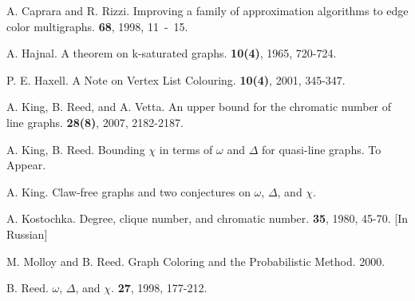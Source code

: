 \documentclass[12pt]{article}
\theoremstyle{plain}
\theoremstyle{definition}
\theoremstyle{remark}
\begin{document}
\begin{thebibliography}{1}

A. Caprara and R. Rizzi.
\newblock Improving a family of approximation algorithms to edge color multigraphs.
 \textbf{68}, 1998, \mbox{11 - 15.}

A. Hajnal.
\newblock A theorem on k-saturated graphs. 
 \textbf{10(4)}, 1965, \mbox{720-724}.

P. E. Haxell.
\newblock A Note on Vertex List Colouring. 
 \textbf{10(4)}, 2001, \mbox{345-347}.

A. King, B. Reed, and A. Vetta. 
\newblock An upper bound for the chromatic number of line graphs. 
 \textbf{28(8)}, 2007, \mbox{2182-2187}.

A. King, B. Reed.
\newblock Bounding $\chi$ in terms of $\omega$ and $\Delta$ for quasi-line graphs.
 To Appear.

A. King.
\newblock Claw-free graphs and two conjectures on $\omega$, $\Delta$, and $\chi$.

A. Kostochka. 
\newblock Degree, clique number, and chromatic number. 
 \textbf{35}, 1980, \mbox{45-70}. [In Russian]

M. Molloy and B. Reed.
\newblock Graph Coloring and the Probabilistic Method.
 2000.

B. Reed.
\newblock $\omega$, $\Delta$, and $\chi$.
 \textbf{27}, 1998, \mbox{177-212}.

\end{thebibliography}
\end{document}
